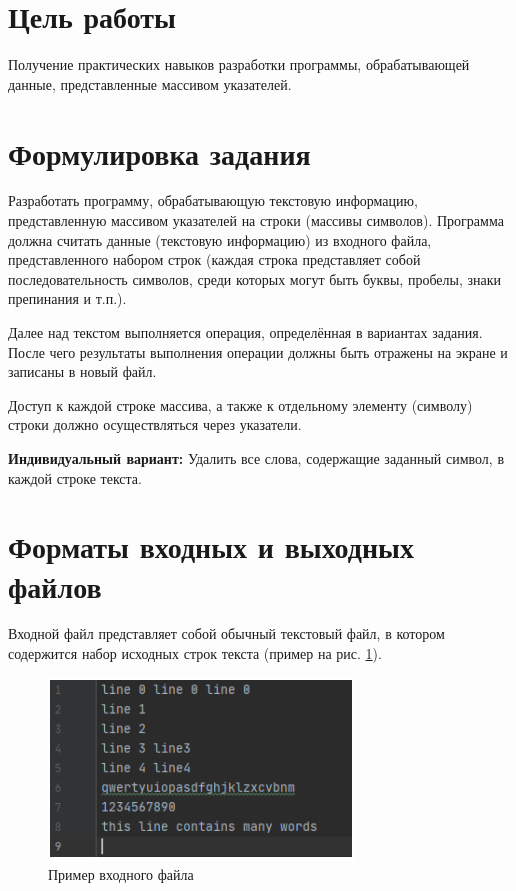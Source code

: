 \documentclass[12pt,a4paper]{article}  %
\begin{document}
	\section*{Цель работы}
	
	Получение
	практических
	навыков
	разработки
	программы,
	обрабатывающей данные, представленные массивом указателей.
	
	\section*{Формулировка задания}
	
	Разработать программу, обрабатывающую текстовую информацию,
	представленную массивом указателей на строки (массивы символов).
	Программа должна считать данные (текстовую информацию) из
	входного файла, представленного набором строк (каждая строка
	представляет собой последовательность символов, среди которых могут быть
	буквы, пробелы, знаки препинания и т.п.). 
	
	Далее над текстом выполняется
	операция, определённая в вариантах задания. После чего результаты
	выполнения операции должны быть отражены на экране и записаны в новый
	файл.
	
	Доступ к каждой строке массива, а также к отдельному элементу
	(символу) строки должно осуществляться через указатели.
	
	\textbf{Индивидуальный вариант:} Удалить все слова, содержащие заданный символ, в каждой строке текста.
	
	\section*{Форматы входных и выходных файлов}
	
	Входной файл представляет собой обычный текстовый файл, в котором содержится набор исходных строк текста (пример на рис. \ref{ife}).
	
	\begin{figure}[H]
		\centering
		\includegraphics[width=0.6\linewidth]{photo/file_example}
		\caption{Пример входного файла}
		\label{ife}
	\end{figure}
	
\end{document}

